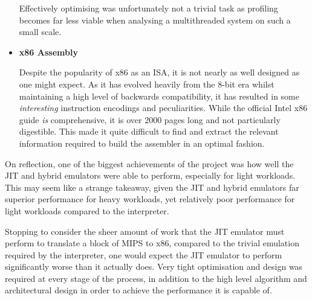 \begin{itemize}
    Effectively optimising was unfortunately not a trivial task as profiling becomes far less viable when analysing a multithreaded system on such a small scale.

    \item \textbf{x86 Assembly}

    Despite the popularity of x86 as an ISA, it is not nearly as well designed as one might expect. As it has evolved heavily from the 8-bit era whilst maintaining a high level of backwards compatibility, it has resulted in some \textit{interesting} instruction encodings and peculiarities. While the official Intel x86 guide \textit{is} comprehensive, it is over 2000 pages long and not particularly digestible. This made it quite difficult to find and extract the relevant information required to build the assembler in an optimal fashion.
\end{itemize}

On reflection, one of the biggest achievements of the project was how well the JIT and hybrid emulators were able to perform, especially for light workloads. This may seem like a strange takeaway, given the JIT and hybrid emulators far superior performance for heavy workloads, yet relatively poor performance for light workloads compared to the interpreter.

Stopping to consider the sheer amount of work that the JIT emulator must perform to translate a block of MIPS to x86, compared to the trivial emulation required by the interpreter, one would expect the JIT emulator to perform significantly worse than it actually does. Very tight optimisation and design was required at every stage of the process, in addition to the high level algorithm and architectural design in order to achieve the performance it is capable of.